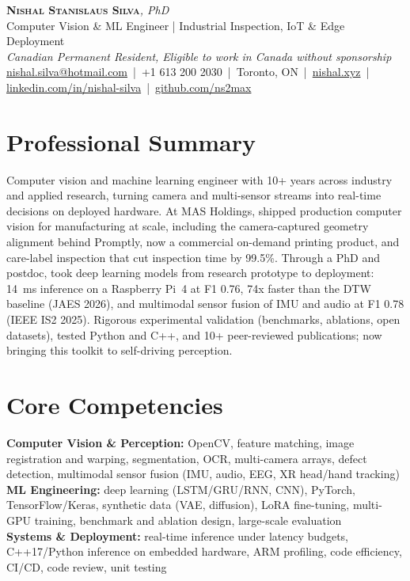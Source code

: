 \documentclass[11pt]{article}
\makeatletter
\newcommand{\cvName}{Nishal Stanislaus Silva}
\newcommand{\cvEmail}{nishal.silva@hotmail.com}
\newcommand{\cvPhone}{+1 613 200 2030}
\newcommand{\cvCity}{Toronto, ON}
\newcommand{\cvSite}{https://nishal.xyz}
\newcommand{\cvLinkedIn}{https://www.linkedin.com/in/nishal-silva}
\newcommand{\cvGitHub}{https://github.com/ns2max}
\newcommand{\cvStatus}{Canadian Permanent Resident, Eligible to work in Canada without sponsorship}
\newcommand{\cvTagline}{Computer Vision \& ML Engineer | Industrial Inspection, IoT \& Edge Deployment}
\makeatother
\begin{document}
\pagestyle{empty}

\begin{center}
    {\LARGE \scshape \textbf{\cvName}}{\large \textit{, PhD}}
    \\[1pt]
    {\small \cvTagline}
    \\[1pt]
    {\footnotesize\textit{\cvStatus}}
    \\[1pt]
    {\small
    \href{mailto:\cvEmail}{\cvEmail}
    \,|\, \cvPhone
    \,|\, \cvCity
    \,|\, \href{\cvSite}{nishal.xyz}
    \,|\, \href{\cvLinkedIn}{linkedin.com/in/nishal-silva}
    \,|\, \href{\cvGitHub}{github.com/ns2max}}
\end{center}

\section*{Professional Summary}
Computer vision and machine learning engineer with 10+ years across industry and applied research, turning camera and multi-sensor streams into real-time decisions on deployed hardware. At MAS Holdings, shipped production computer vision for manufacturing at scale, including the camera-captured geometry alignment behind Promptly, now a commercial on-demand printing product, and care-label inspection that cut inspection time by 99.5\%. Through a PhD and postdoc, took deep learning models from research prototype to deployment: 14~ms inference on a Raspberry Pi~4 at F1 0.76, 74x faster than the DTW baseline (JAES 2026), and multimodal sensor fusion of IMU and audio at F1 0.78 (IEEE IS2 2025). Rigorous experimental validation (benchmarks, ablations, open datasets), tested Python and C++, and 10+ peer-reviewed publications; now bringing this toolkit to self-driving perception.

\section*{Core Competencies}
\textbf{Computer Vision \& Perception:} OpenCV, feature matching, image registration and warping, segmentation, OCR, multi-camera arrays, defect detection, multimodal sensor fusion (IMU, audio, EEG, XR head/hand tracking)\\
\textbf{ML Engineering:} deep learning (LSTM/GRU/RNN, CNN), PyTorch, TensorFlow/Keras, synthetic data (VAE, diffusion), LoRA fine-tuning, multi-GPU training, benchmark and ablation design, large-scale evaluation\\
\textbf{Systems \& Deployment:} real-time inference under latency budgets, C++17/Python inference on embedded hardware, ARM profiling, code efficiency, CI/CD, code review, unit testing
\end{document}
